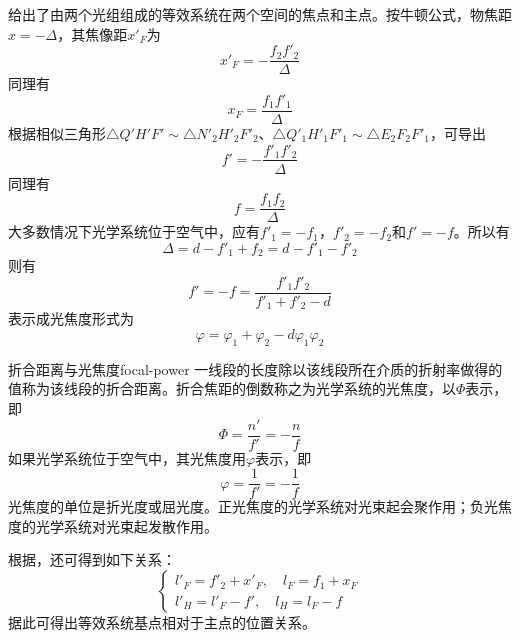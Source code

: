 \documentclass[cn,10pt,chinesefont=founder,math=mtpro2,cite=super,toc=onecol,twoside,openany]{elegantbook}
\begin{document}
 给出了由两个光组组成的等效系统在两个空间的焦点和主点。按牛顿公式，物焦距$x=-\varDelta$，其焦像距$x'_F$为
\begin{equation}
x'_F=-\frac{f_2f'_2}{\varDelta}
\end{equation}
同理有
\begin{equation}
x_F=\frac{f_1f'_1}{\varDelta}
\end{equation}
根据相似三角形$\triangle Q'H'F'\sim\triangle N'_2H'_2F'_2$、$\triangle Q'_1H'_1F'_1\sim\triangle E_2F_2F'_1$，可导出
\begin{equation}
f'=-\frac{f'_1f'_2}{\varDelta}
\label{eq:combination-of-optical-systems-focal-length}
\end{equation}
同理有
\begin{equation}
f=\frac{f_1f_2}{\varDelta}
\end{equation}
大多数情况下光学系统位于空气中，应有$f'_1=-f_1$，$f'_2=-f_2$和$f'=-f$。所以有
\begin{equation}
\varDelta=d-f'_1+f_2=d-f'_1-f'_2
\end{equation}
则有
\begin{equation}
f'=-f=\frac{f'_1f'_2}{f'_1+f'_2-d}
\end{equation}
表示成光焦度形式为
\begin{equation}
\varphi=\varphi_1+\varphi_2-d\varphi_1\varphi_2
\end{equation}

\begin{definition}{折合距离与光焦度}{focal-power}
	一线段的长度除以该线段所在介质的折射率做得的值称为该线段的折合距离。折合焦距的倒数称之为光学系统的光焦度，以$\varPhi$表示，即
	\begin{equation}
	\varPhi=\frac{n'}{f'}=-\frac{n}{f}
	\end{equation}
	如果光学系统位于空气中，其光焦度用$\varphi$表示，即
	\begin{equation}
	\varphi=\frac{1}{f'}=-\frac{1}{f}
	\end{equation}
	光焦度的单位是折光度或屈光度。正光焦度的光学系统对光束起会聚作用；负光焦度的光学系统对光束起发散作用。
\end{definition}

根据，还可得到如下关系：
\begin{equation}
\begin{cases}
l'_F=f'_2+x'_F,\quad l_F=f_1+x_F\\
l'_H=l'_F-f',\quad l_H=l_F-f
\end{cases}
\end{equation}
据此可得出等效系统基点相对于主点的位置关系。
\end{document}
